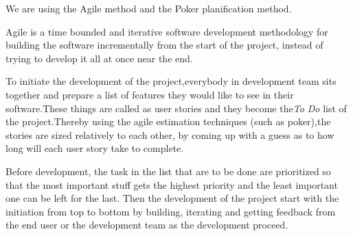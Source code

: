 We are using the Agile method and the Poker planification method.

Agile is a time bounded and iterative software development methodology for building the software incrementally from the start of the project, instead of trying to develop it all at once near the end.

To initiate the development of the project,everybody in development team sits together and prepare a list of features they would like to see in their software.These things are called as user stories and they become the\emph{To Do} list of the project.Thereby using the agile estimation techniques (such as poker),the stories are sized relatively to each other, by coming up with a guess as to how long will each user story take to complete. 

Before development, the task in the list that are to be done are prioritized  so that the most important stuff gets the highest priority and the least important one can be left for the last.
Then the development of the project start with the initiation from top to bottom by building, iterating and getting feedback from the end user or the development team as the development proceed.
